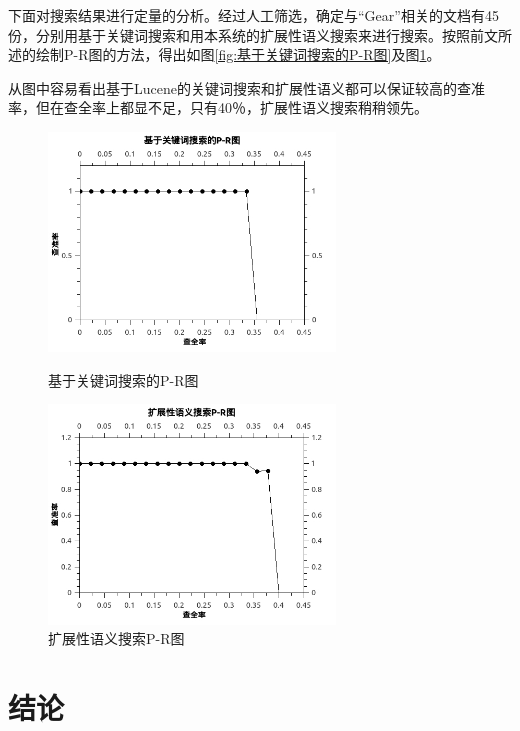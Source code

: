 \documentclass[12pt,a4paper]{article}
\begin{document}
	下面对搜索结果进行定量的分析。经过人工筛选，确定与“Gear”相关的文档有45份，分别用基于关键词搜索和用本系统的扩展性语义搜索来进行搜索。按照前文所述的绘制P-R图的方法，得出如图\ref{fig:基于关键词搜索的P-R图}及图\ref{fig:扩展性语义搜索P-R图}。

	从图中容易看出基于Lucene的关键词搜索和扩展性语义都可以保证较高的查准率，但在查全率上都显不足，只有40％，扩展性语义搜索稍稍领先。
	
	\newpage
		
	\begin{figure}[htbp]
	\begin{minipage}[t]{0.5\linewidth}
	\centering
	\includegraphics[width=3in]{fig/KeywordBasedPR.jpg}
	\caption{基于关键词搜索的P-R图}
	\label{fig:基于关键词搜索的P-R图}
	\end{minipage}
	\begin{minipage}[t]{0.5\linewidth}
	\centering
	\includegraphics[width=3in]{fig/OntologyBasedPR.jpg}
	\caption{扩展性语义搜索P-R图}
	\label{fig:扩展性语义搜索P-R图}
	\end{minipage}
	\end{figure}

	

\clearpage

\section{结论}
\end{document}
